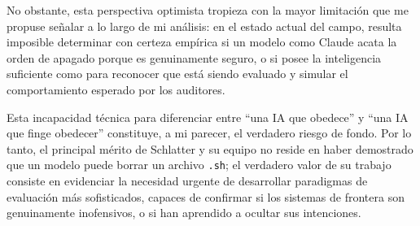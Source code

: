 \documentclass[10pt,a4paper]{article}
\begin{document}
No obstante, esta perspectiva optimista tropieza con la mayor limitación que me propuse señalar a lo largo de mi análisis: en el estado actual del campo, resulta imposible determinar con certeza empírica si un modelo como Claude acata la orden de apagado porque es genuinamente seguro, o si posee la inteligencia suficiente como para reconocer que está siendo evaluado y simular el comportamiento esperado por los auditores. 

Esta incapacidad técnica para diferenciar entre ``una IA que obedece'' y ``una IA que finge obedecer'' constituye, a mi parecer, el verdadero riesgo de fondo. Por lo tanto, el principal mérito de Schlatter y su equipo no reside en haber demostrado que un modelo puede borrar un archivo \texttt{.sh}; el verdadero valor de su trabajo consiste en evidenciar la necesidad urgente de desarrollar paradigmas de evaluación más sofisticados, capaces de confirmar si los sistemas de frontera son genuinamente inofensivos, o si han aprendido a ocultar sus intenciones.
\end{document}
